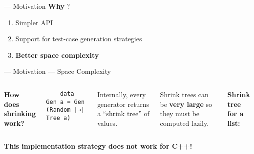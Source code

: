 \begin{frame}{\halcheck{} --- Motivation}
  \textbf{Why} \halcheck{}?

  \begin{enumerate}
    \item Simpler API
    \item Support for test-case generation strategies
    \item \textbf{Better space complexity}
  \end{enumerate}
\end{frame}

\begin{frame}[fragile]{\halcheck{} --- Motivation --- Space Complexity}
  \begin{columns}[t]
    \textbf{How does shrinking work?}

    \bigskip

    \begin{verbatim}
    data Gen a = Gen (Random |→| Tree a)
    \end{verbatim}

    \bigskip

    Internally, every generator returns a ``shrink tree'' of values.

    \bigskip

    Shrink trees can be \textbf{very large} so they must be computed lazily.

    \textbf{Shrink tree for a list:}
  \end{columns}

  \pause{}

  \textbf{This implementation strategy does not work for C++!}
\end{frame}

